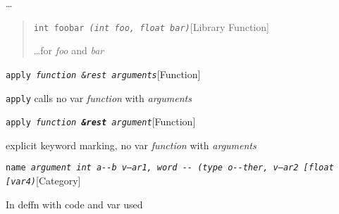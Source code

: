 \documentclass{book}
\begin{document}
%
\dots{}\@

\begin{quote}
\noindent\texttt{int foobar \bgroup{}\normalfont{}\textsl{(int \textsl{foo}, float \textsl{bar})}\egroup{}}\hfill[Library Function]



%
\dots{}\@ for \textsl{foo} and \textsl{bar}
\end{quote}

\noindent\texttt{apply \bgroup{}\normalfont{}\textsl{function \&rest arguments}\egroup{}}\hfill[Function]



%
\texttt{apply} calls no var \textsl{function} with \textsl{arguments}

\noindent\texttt{apply \bgroup{}\normalfont{}\textsl{function \textrm{\textbf{\&rest}} argument}\egroup{}}\hfill[Function]



%
explicit keyword marking, no var \textsl{function} with \textsl{arguments}

\noindent\texttt{name \bgroup{}\normalfont{}\textsl{argument \texttt{int} \texttt{a{-}{-}b} \textsl{v--ar1}, word \texttt{{-}{-}} (\texttt{type o{-}{-}ther}, \textsl{v---ar2}  {[}\texttt{float} {[}\textsl{var4})}\egroup{}}\hfill[Category]



%
In deffn with code and var used
\end{document}
